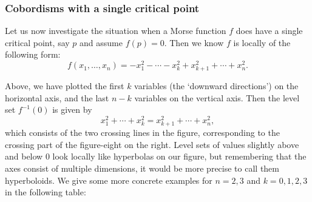 \subsubsection*{Cobordisms with a single critical point}
Let us now investigate the situation when a Morse function $f$ does have a single critical point, say $p$ and assume $f(p) = 0$.
Then we know $f$ is locally of the following form:
\[
    f(x_1, \ldots, x_n) = - x_1^2 - \cdots - x_k^2 + x_{k+1}^2 + \cdots + x_n^2
.\] 
\begin{figure}[H]
    \centering
\end{figure}
\vspace{-1cm}
Above, we have plotted the first $k$ variables (the `downward directions') on the horizontal axis, and the last $n-k$ variables on the vertical axis.
Then the level set $f^{-1}(0)$ is given by
\[
x_1^2 + \cdots + x_k^2 = x_{k+1} ^2 + \cdots + x_n^2
,\] 
which consists of the two crossing lines in the figure, corresponding to the crossing part of the figure-eight on the right.
Level sets of values slightly above and below $0$ look locally like hyperbolas on our figure, but remembering that the axes consist of multiple dimensions, it would be more precise to call them hyperboloids. We give some more concrete examples for $n=2,3$ and  $k=0,1,2,3$ in the following table:
\bigskip
\begin{table}[H]
    \centering
\end{table}
\clearpage


